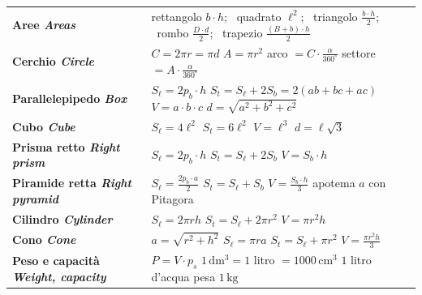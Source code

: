 \documentclass[11pt,a4paper]{article}
\newcommand{\unit}[1]{\,\mathrm{#1}}
\newcommand{\cmc}{\unit{cm^3}}
\begin{document}
{\begin{tabularx}{\linewidth}{@{}>{\bfseries}p{3.4cm} X@{}}
Aree \newline \textit{\mdseries Areas} & rettangolo $b\cdot h$; \ quadrato $\ell^2$; \ triangolo $\frac{b\cdot h}{2}$; \ rombo $\frac{D\cdot d}{2}$; \ trapezio $\frac{(B+b)\cdot h}{2}$\\
Cerchio \newline \textit{\mdseries Circle} & $C=2\pi r=\pi d$ \qquad $A=\pi r^2$ \qquad arco $=C\cdot\frac{\alpha}{360^\circ}$ \qquad settore $=A\cdot\frac{\alpha}{360^\circ}$\\
Parallelepipedo \newline \textit{\mdseries Box} & $S_\ell=2p_b\cdot h$ \quad $S_t=S_\ell+2S_b=2(ab+bc+ac)$ \quad $V=a\cdot b\cdot c$ \quad $d=\sqrt{a^2+b^2+c^2}$\\
Cubo \newline \textit{\mdseries Cube} & $S_\ell=4\ell^2$ \quad $S_t=6\ell^2$ \quad $V=\ell^3$ \quad $d=\ell\sqrt3$\\
Prisma retto \newline \textit{\mdseries Right prism} & $S_\ell=2p_b\cdot h$ \quad $S_t=S_\ell+2S_b$ \quad $V=S_b\cdot h$\\
Piramide retta \newline \textit{\mdseries Right pyramid} & $S_\ell=\frac{2p_b\cdot a}{2}$ \quad $S_t=S_\ell+S_b$ \quad $V=\frac{S_b\cdot h}{3}$ \quad apotema $a$ con Pitagora\\
Cilindro \newline \textit{\mdseries Cylinder} & $S_\ell=2\pi rh$ \quad $S_t=S_\ell+2\pi r^2$ \quad $V=\pi r^2h$\\
Cono \newline \textit{\mdseries Cone} & $a=\sqrt{r^2+h^2}$ \quad $S_\ell=\pi ra$ \quad $S_t=S_\ell+\pi r^2$ \quad $V=\frac{\pi r^2h}{3}$\\
Peso e capacità \newline \textit{\mdseries Weight, capacity} & $P=V\cdot p_s$ \qquad $1\unit{dm^3}=1$ litro $=1000\cmc$ \qquad $1$ litro d'acqua pesa $1\unit{kg}$\\
\bottomrule
\end{tabularx}
}
\end{document}

